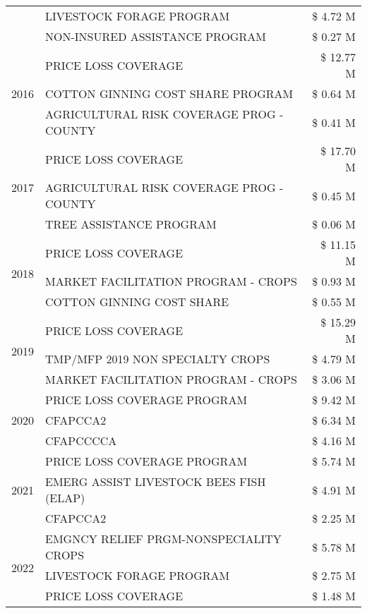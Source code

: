 \begin{tabular}{llr}
 & LIVESTOCK FORAGE PROGRAM & \$ 4.72 M \\
 & NON-INSURED ASSISTANCE PROGRAM & \$ 0.27 M \\
\cline{1-3}
\multirow[t]{3}{*}{2016} & PRICE LOSS COVERAGE & \$ 12.77 M \\
 & COTTON GINNING COST SHARE PROGRAM & \$ 0.64 M \\
 & AGRICULTURAL RISK COVERAGE PROG - COUNTY & \$ 0.41 M \\
\cline{1-3}
\multirow[t]{3}{*}{2017} & PRICE LOSS COVERAGE & \$ 17.70 M \\
 & AGRICULTURAL RISK COVERAGE PROG - COUNTY & \$ 0.45 M \\
 & TREE ASSISTANCE PROGRAM & \$ 0.06 M \\
\cline{1-3}
\multirow[t]{3}{*}{2018} & PRICE LOSS COVERAGE & \$ 11.15 M \\
 & MARKET FACILITATION PROGRAM - CROPS & \$ 0.93 M \\
 & COTTON GINNING COST SHARE & \$ 0.55 M \\
\cline{1-3}
\multirow[t]{3}{*}{2019} & PRICE LOSS COVERAGE & \$ 15.29 M \\
 & TMP/MFP 2019 NON SPECIALTY CROPS & \$ 4.79 M \\
 & MARKET FACILITATION PROGRAM - CROPS & \$ 3.06 M \\
\cline{1-3}
\multirow[t]{3}{*}{2020} & PRICE LOSS COVERAGE PROGRAM & \$ 9.42 M \\
 & CFAPCCA2 & \$ 6.34 M \\
 & CFAPCCCCA & \$ 4.16 M \\
\cline{1-3}
\multirow[t]{3}{*}{2021} & PRICE LOSS COVERAGE PROGRAM & \$ 5.74 M \\
 & EMERG ASSIST LIVESTOCK BEES FISH (ELAP) & \$ 4.91 M \\
 & CFAPCCA2 & \$ 2.25 M \\
\cline{1-3}
\multirow[t]{3}{*}{2022} & EMGNCY RELIEF PRGM-NONSPECIALITY CROPS & \$ 5.78 M \\
 & LIVESTOCK FORAGE PROGRAM & \$ 2.75 M \\
 & PRICE LOSS COVERAGE & \$ 1.48 M \\
\cline{1-3}
\bottomrule
\end{tabular}
